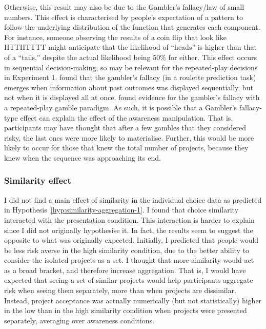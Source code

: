 \documentclass[a4paper, nobind, dvipsnames]{templates/ociamthesis}
\theoremstyle{definition}
\theoremstyle{definition}
\theoremstyle{definition}
\theoremstyle{definition}
\theoremstyle{remark}
\begin{document}
Otherwise, this result may also be due to the Gambler's fallacy/law of small
numbers. This effect is characterised by people's expectation of a pattern to
follow the underlying distribution of the function that generates each
component. For instance, someone observing the results of a coin flip that look
like HTTHTTTT might anticipate that the likelihood of ``heads'' is higher than
that of a ``tails,'' despite the actual likelihood being 50\% for either. This
effect occurs in sequential decision-making, so may be relevant for the
repeated-play decisions in Experiment 1. \textcite{barron2010} found that the gambler's
fallacy (in a roulette prediction task) emerges when information about past
outcomes was displayed sequentially, but not when it is displayed all at once.
\textcite{haisley2008} found evidence for the gambler's fallacy with a repeated-play
gamble paradigm. As such, it is possible that a Gambler's fallacy-type effect
can explain the effect of the awareness manipulation. That is, participants may
have thought that after a few gambles that they considered risky, the last ones
were more likely to materialise. Further, this would be more likely to occur for
those that knew the total number of projects, because they knew when the
sequence was approaching its end.

\hypertarget{similarity-discussion-aggregation-1}{%
\subsubsection{Similarity effect}\label{similarity-discussion-aggregation-1}}

I did not find a main effect of similarity in the individual choice data as
predicted in Hypothesis~\ref{hyp:similarity-aggregation-1}. I found that
choice similarity interacted with the presentation condition. This interaction
is harder to explain since I did not originally hypothesise it. In fact, the
results seem to suggest the opposite to what was originally expected. Initially,
I predicted that people would be less risk averse in the high similarity
condition, due to the better ability to consider the isolated projects as a set.
I thought that more similarity would act as a broad bracket, and therefore
increase aggregation. That is, I would have expected that seeing a set of
similar projects would help participants aggregate risk when seeing them
separately, more than when projects are dissimilar. Instead, project acceptance
was actually numerically (but not statistically) higher in the low than in the
high similarity condition when projects were presented separately, averaging
over awareness conditions.
\end{document}
